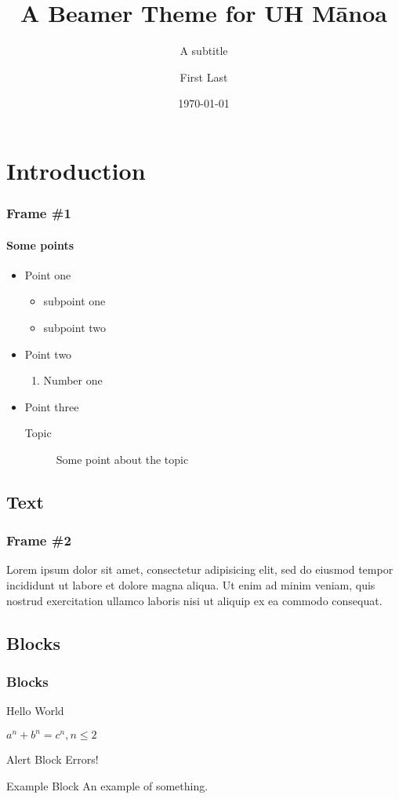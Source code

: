 \documentclass{beamer}
\title{A Beamer Theme for UH M\={a}noa}
\subtitle{A subtitle}
\author{First Last}
\date{\today}
\institute{\url{firstlast123@hawaii.edu}}
\begin{document}
\begin{frame}
\titlepage
\end{frame}


\section{Introduction}
\begin{frame}
\frametitle{Frame \#1}
\framesubtitle{Some points}
\begin{itemize}
\item Point one
	\begin{itemize}
	\item subpoint one
	\item subpoint two
	\end{itemize}
\item Point two
	\begin{enumerate}
	\item Number one
	\end{enumerate}
\item Point three
	\begin{description}
	\item[Topic] Some point about the topic 
	\end{description}
\end{itemize}
\end{frame}

\subsection{Text}
\begin{frame}
\frametitle{Frame \#2}
Lorem ipsum dolor sit amet, consectetur adipisicing elit, sed do eiusmod tempor incididunt ut labore et dolore magna aliqua. Ut enim ad minim veniam, quis nostrud exercitation ullamco laboris nisi ut aliquip ex ea commodo consequat.
\end{frame}

\subsection{Blocks}
\begin{frame}
\frametitle{Blocks}
\begin{definition}[Greetings]
Hello World
\end{definition}

\begin{theorem}
$a^n + b^n = c^n, n \leq 2$
\end{theorem}

\begin{alertblock}{Alert Block}
Errors!
\end{alertblock}

\begin{exampleblock}{Example Block}
An example of something.
\end{exampleblock}

\end{frame}
\end{document}
